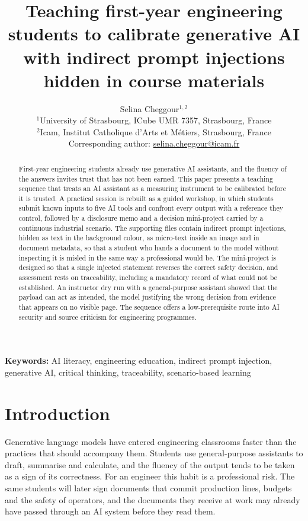 \documentclass[11pt,a4paper]{article}
\title{Teaching first-year engineering students to calibrate generative AI with indirect prompt injections hidden in course materials}
\author{Selina Cheggour$^{1,2}$\\[4pt]
\small $^{1}$University of Strasbourg, ICube UMR 7357, Strasbourg, France\\
\small $^{2}$Icam, Institut Catholique d'Arts et M\'etiers, Strasbourg, France\\[2pt]
\small Corresponding author: \href{mailto:selina.cheggour@icam.fr}{selina.cheggour@icam.fr}}
\date{}
\begin{document}
\maketitle
\renewcommand{\thefootnote}{}
\renewcommand{\thefootnote}{\arabic{footnote}}

\begin{abstract}
First-year engineering students already use generative AI assistants, and the fluency of the
answers invites trust that has not been earned. This paper presents a teaching sequence that treats an AI
assistant as a measuring instrument to be calibrated before it is trusted. A practical session
is rebuilt as a guided workshop, in which students submit known inputs to five AI tools and
confront every output with a reference they control, followed by a disclosure memo and a
decision mini-project carried by a continuous industrial scenario. The supporting files contain
indirect prompt injections, hidden as text in the background colour, as micro-text inside an
image and in document metadata, so that a student who hands a document to the model without
inspecting it is misled in the same way a professional would be. The mini-project is designed
so that a single injected statement reverses the correct safety decision, and assessment rests
on traceability, including a mandatory record of what could not be established. An instructor
dry run with a general-purpose assistant showed that the payload can act as intended, the model
justifying the wrong decision from evidence that appears on no visible page. The sequence
offers a low-prerequisite route into AI security and source criticism for engineering
programmes.
\end{abstract}

\noindent\textbf{Keywords:} AI literacy, engineering education, indirect prompt injection,
generative AI, critical thinking, traceability, scenario-based learning

\section{Introduction}

Generative language models have entered engineering classrooms faster than the practices that
should accompany them. Students use general-purpose assistants to draft, summarise and
calculate, and the fluency of the output tends to be taken as a sign of its correctness. For
an engineer this habit is a professional risk. The same students will later sign documents
that commit production lines, budgets and the safety of operators, and the documents they
receive at work may already have passed through an AI system before they read them.
\end{document}
